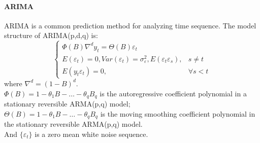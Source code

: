 \documentclass[12pt]{mcmthesis}
\begin{document}
\paragraph{ARIMA}
ARIMA is a common prediction method for analyzing time sequence\cite{ARIMA}. The model structure of ARIMA(p,d,q) is:
\begin{equation}
\left\{
\begin{array}{cc}
\Phi(B)\nabla^dy_t=\Theta(B)\varepsilon_t\\
E(\varepsilon_t)=0,Var(\varepsilon_t)=\sigma_{\varepsilon}^2,E(\varepsilon_t\varepsilon_s),&s\neq t\\
E(y_t\varepsilon_t)=0,&\forall s<t
\end{array}
\right.
\end{equation}
where
$\nabla^d=(1-B)^d$.\\
$\Phi(B)=1-\theta_1B-\dotsc-\theta_qB_q$ is the autoregressive coefficient polynomial in a stationary reversible ARMA(p,q) model;\\
$\Theta(B)=1-\theta_1B-\dotsc-\theta_qB_q$ is the moving smoothing coefficient polynomial in the stationary reversible ARMA(p,q) model.\\
And $\{\varepsilon_t\}$ is a zero mean white noise sequence.
\end{document}
